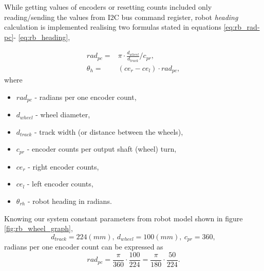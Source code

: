 While getting values of encoders or resetting counts included only reading/sending the values from  I2C bus command register, robot \textit{heading} calculation is implemented realising two formulas stated in equations \ref{eq:rb_rad-pc}- \ref{eq:rb_heading},

\begin{eqnarray}
rad_{pc}  = & \pi \cdot \frac{ d_{wheel} }{ d_{track} } / c_{pr}	,
\label{eq:rb_rad-pc}
\\
\theta_{h} = & (ce_{r} - ce_{l} ) \cdot rad_{pc} ,
\label{eq:rb_heading}
\end{eqnarray}
where 
\begin{itemize}
	\item $rad_{pc}$ - radians per one encoder count,
	\item $d_{wheel}$ - wheel diameter,
	\item $d_{track}$ - track width (or distance between the wheels), %
	\item $c_{pr}$ - encoder counts per output shaft (wheel) turn,
	\item $ce_{r}$ - right encoder counts,
	\item $ce_{l}$ - left encoder counts,
	\item $\theta_{rh}$ - robot heading in radians.
\end{itemize}

Knowing our system constant parameters from robot model shown in figure \ref{fig:rb_wheel_graph},
$$
d_{track} = 224 (mm), \ d_{wheel}=100 (mm), \ c_{pr}=360,
$$
radians per one encoder count can be expressed as
$$
rad_{pc}  = \frac{\pi}{360}\cdot \frac{ 100 }{ 224 } = \frac{\pi}{180}\cdot \frac{ 50 }{ 224 }.
$$

